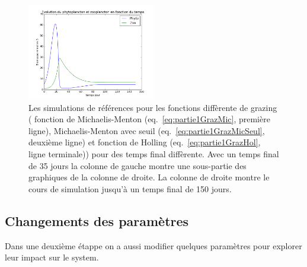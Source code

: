 {\begin{figure}[h]
  \includegraphics[width=0.5\textwidth]{partie1/refHol150.png}
  \caption{Les simulations de références pour les fonctions diffèrente de grazing (
fonction de Michaelis-Menton (eq.~\ref{eq:partie1GrazMic}, première ligne),
Michaelis-Menton avec seuil (eq.~\ref{eq:partie1GrazMicSeul}, deuxième ligne) et fonction de
Holling (eq.~\ref{eq:partie1GrazHol}, ligne terminale)) pour des temps final diffèrente.
Avec un temps final de 35 jours la colonne de gauche montre une sous-partie des graphiques
de la colonne de droite. La colonne de droite montre le cours de simulation jusqu'à un temps
final de 150 jours.}
  \label{fig:partie1RefSimulations}
\end{figure}

\clearpage
\subsection{Changements des paramètres}

\par{
Dans une deuxième étappe on a aussi modifier quelques paramètres pour explorer leur impact sur le system.
}

}
